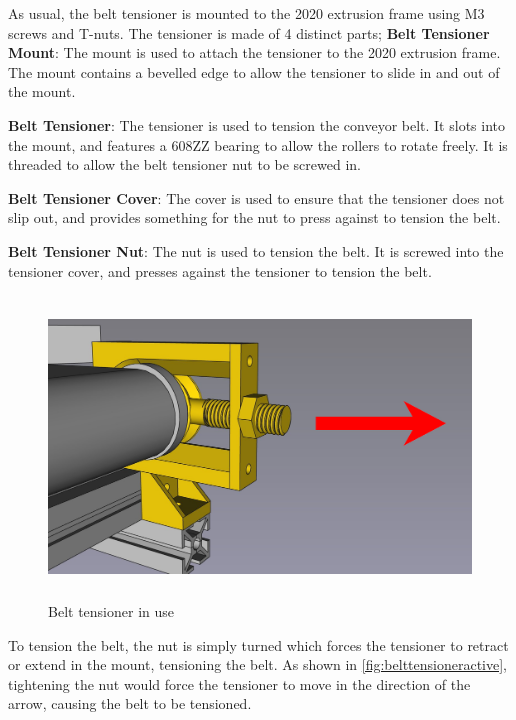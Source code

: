 As usual, the belt tensioner is mounted to the 2020 extrusion frame using M3 screws and T-nuts. The tensioner is made of 4 distinct parts;
\textbf{Belt Tensioner Mount}: The mount is used to attach the tensioner to the 2020 extrusion frame. The mount contains a bevelled edge to allow the tensioner to slide in and out of the mount.
\par
\textbf{Belt Tensioner}: The tensioner is used to tension the conveyor belt. It slots into the mount, and features a 608ZZ bearing to allow the rollers to rotate freely. It is threaded to allow the belt tensioner nut to be screwed in.
\par
\textbf{Belt Tensioner Cover}: The cover is used to ensure that the tensioner does not slip out, and provides something for the nut to press against to tension the belt.
\par
\textbf{Belt Tensioner Nut}: The nut is used to tension the belt. It is screwed into the tensioner cover, and presses against the tensioner to tension the belt.

\begin{figure}[H]
    \begin{minipage}[h]{0.95\textwidth}
        \centering
        \includegraphics[height=8cm]{imgs/freecad/tensionerapplication.jpg}
        \caption{Belt tensioner in use}
        \label{fig:belttensioneractive}
    \end{minipage}
\end{figure}

To tension the belt, the nut is simply turned which forces the tensioner to retract or extend in the mount, tensioning the belt. As shown in \autoref{fig:belttensioneractive}, tightening the nut would force the tensioner to move in the direction of the arrow, causing the belt to be tensioned.

